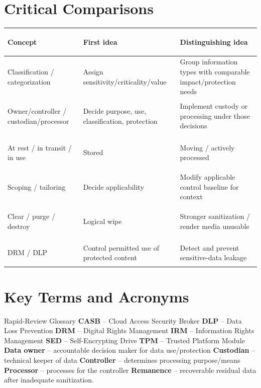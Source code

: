 \documentclass[10pt,letterpaper]{article}
\begin{document}
\section{Critical Comparisons}
\begin{center}\small
\begin{tabularx}{\textwidth}{>{\bfseries\color{Navy}\raggedright\arraybackslash}p{}>{\raggedright\arraybackslash}X>{\raggedright\arraybackslash}X}
\toprule Concept & First idea & Distinguishing idea\\\midrule
Classification / categorization & Assign sensitivity/criticality/value & Group information types with comparable impact/protection needs\\
Owner/controller / custodian/processor & Decide purpose, use, classification, protection & Implement custody or processing under those decisions\\
At rest / in transit / in use & Stored & Moving / actively processed\\
Scoping / tailoring & Decide applicability & Modify applicable control baseline for context\\
Clear / purge / destroy & Logical wipe & Stronger sanitization / render media unusable\\
DRM / DLP & Control permitted use of protected content & Detect and prevent sensitive-data leakage\\
\bottomrule
\end{tabularx}
\end{center}

\section{Key Terms and Acronyms}
\begin{summarybox}{Rapid-Review Glossary}
\textbf{CASB} -- Cloud Access Security Broker \quad
\textbf{DLP} -- Data Loss Prevention \quad
\textbf{DRM} -- Digital Rights Management \quad
\textbf{IRM} -- Information Rights Management \quad
\textbf{SED} -- Self-Encrypting Drive \quad
\textbf{TPM} -- Trusted Platform Module \quad
\textbf{Data owner} -- accountable decision maker for data use/protection \quad
\textbf{Custodian} -- technical keeper of data \quad
\textbf{Controller} -- determines processing purpose/means \quad
\textbf{Processor} -- processes for the controller \quad
\textbf{Remanence} -- recoverable residual data after inadequate sanitization.
\end{summarybox}
\end{document}
